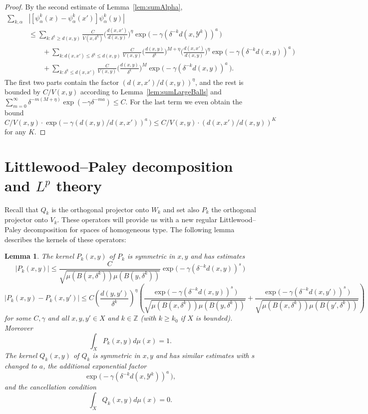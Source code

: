\documentclass{amsart}
\numberwithin{equation}{section}
\theoremstyle{plain}
\newtheorem{lemma}[equation]{Lemma}
\theoremstyle{definition}
\theoremstyle{remark}
\begin{document}
{{{\begin{proof}
By the second estimate of Lemma~\ref{lem:sumAlpha},
\begin{equation*}
\begin{split}
  \sum_{k,\alpha} &{|{[\psi^k_\alpha(x)-\psi^k_\alpha(x')]\psi^k_\alpha(y)}|} \\
  &\leq\sum_{k:\delta^k\geq d(x,y)}\frac{C}{V(x,\delta^k)}\Big(\frac{d(x,x')}{d(x,y)}\Big)^{\eta}\exp\big(-\gamma (\delta ^{-k}{d(x,\mathscr{Y}^k)})^a \, \big)  \\
  &\qquad+\sum_{k:d(x,x')\leq \delta^k\leq d(x,y)}\frac{C}{V(x,y)}
   \Big(\frac{d(x,y)}{\delta^k}\Big)^{M+\eta}\Big(\frac{d(x,x')}{d(x,y)}\Big)^{\eta}\exp\big(-\gamma (\delta ^{-k}{d(x,y)})^a \, \big) \\
  &\qquad+\sum_{k:\delta^k\leq d(x,x')}\frac{C}{V(x,y)}
   \Big(\frac{d(x,y)}{\delta^k}\Big)^{M}\exp\big(-\gamma (\delta ^{-k}{d(x,y)})^a \, \big).
\end{split}
\end{equation*}
The first two parts contain the factor $(d(x,x')/d(x,y))^{\eta}$, and the rest is bounded by $C/V(x,y)$ according to Lemma~\ref{lem:sumLargeBalls} and $\sum_{m=0}^{\infty}\delta^{-m(M+\eta)}\exp(-\gamma\delta^{-ma})\leq C$. For the last term we even obtain the bound $C/V(x,y)\cdot\exp\big(-\gamma (d(x,y)/d(x,x'))^a\, \big)\leq C/V(x,y)\cdot (d(x,x')/d(x,y))^K$ for any $K$.
\end{proof}

 \section{Littlewood--Paley decomposition and $L^p$ theory}

 

Recall that $Q_{k}$ is the orthogonal projector onto $W_{k}$ and set also $P_{k}$ the orthogonal projector onto $V_{k}$. These operators will provide us with a new regular Littlewood--Paley decomposition for spaces of homogeneous type. The following lemma describes the kernels of these operators:

\begin{lemma} The kernel $P_{k}(x,y)$ of $P_{k}$ is  symmetric in $x,y$ and  has estimates
$$|P_{k}(x,y)|\le  \frac{C}{\sqrt{\mu(B(x,\delta^k))\mu(B(y,\delta ^k))}} \exp\big(-\gamma (\delta ^{-k}{d(x,y)})^s \, \big)
$$
$$|P_{k}(x,y)-P_{k}(x,y')|\le C \left({\frac{d(y,y')}{\delta ^{k}}}\right)^\eta
\left ( \frac{\exp\big(-\gamma (\delta ^{-k}{d(x,y)})^s \, \big)}{\sqrt{\mu(B(x,\delta^k))\mu(B(y,\delta ^k))}}+ \frac{\exp\big(-\gamma (\delta ^{-k}{d(x,y')})^s \, \big)}{\sqrt{\mu(B(x,\delta^k))\mu(B(y',\delta ^k))}}\right)$$
for some $C,\gamma$ and all $x,y,y'\in X$ and $k\in {\mathbb{Z}}$ (with $k\ge k_{0}$ if $X$ is bounded). 
Moreover
$$
\int_{X}P_{k}(x,y)d\mu(x)=1.
$$
The kernel $Q_{k}(x,y)$ of $Q_{k}$ is  symmetric in $x,y$ and  has similar estimates with {$s$ changed to $a$}, the additional exponential factor
\begin{equation*}
  \exp\big(-\gamma(\delta^{-k}d(x,\mathscr{Y}^k))^a \, \big),
\end{equation*}
and the cancellation condition
$$
\int_{X}Q_{k}(x,y)d\mu(x)=0.
$$
\end{lemma}

}}}
\end{document}
